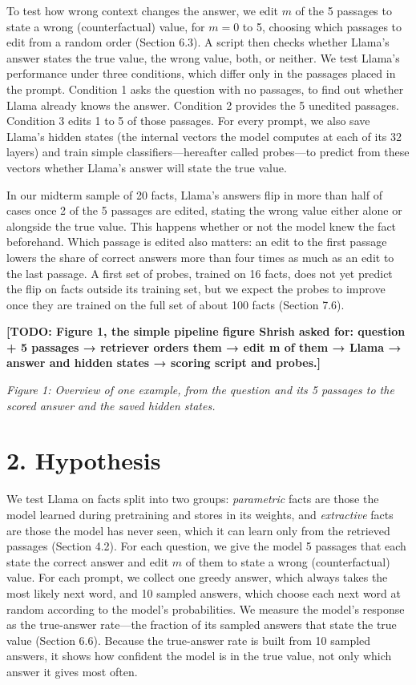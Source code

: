 \documentclass[
  12pt,
  letterpaper,
]{article}
\begin{document}
To test how wrong context changes the answer, we
edit \(m\) of the 5 passages to state a wrong
(counterfactual) value, for \(m = 0\) to 5,
choosing which passages to edit from a random
order (Section 6.3). A script then checks whether
Llama's answer states the true value, the wrong
value, both, or neither. We test Llama's
performance under three conditions, which differ
only in the passages placed in the prompt.
Condition 1 asks the question with no passages, to
find out whether Llama already knows the answer.
Condition 2 provides the 5 unedited passages.
Condition 3 edits 1 to 5 of those passages. For
every prompt, we also save Llama's hidden states
(the internal vectors the model computes at each
of its 32 layers) and train simple
classifiers---hereafter called probes---to predict
from these vectors whether Llama's answer will
state the true value.

In our midterm sample of 20 facts, Llama's answers
flip in more than half of cases once 2 of the 5
passages are edited, stating the wrong value
either alone or alongside the true value. This
happens whether or not the model knew the fact
beforehand. Which passage is edited also matters:
an edit to the first passage lowers the share of
correct answers more than four times as much as an
edit to the last passage. A first set of probes,
trained on 16 facts, does not yet predict the flip
on facts outside its training set, but we expect
the probes to improve once they are trained on the
full set of about 100 facts (Section 7.6).

\textbf{{[}TODO: Figure 1, the simple pipeline
figure Shrish asked for: question + 5 passages →
retriever orders them → edit m of them → Llama →
answer and hidden states → scoring script and
probes.{]}}

\emph{Figure 1: Overview of one example, from the
question and its 5 passages to the scored answer
and the saved hidden states.}

\section{2. Hypothesis}\label{hypothesis}

We test Llama on facts split into two groups:
\emph{parametric} facts are those the model
learned during pretraining and stores in its
weights, and \emph{extractive} facts are those the
model has never seen, which it can learn only from
the retrieved passages (Section 4.2). For each
question, we give the model 5 passages that each
state the correct answer and edit \(m\) of them to
state a wrong (counterfactual) value. For each
prompt, we collect one greedy answer, which always
takes the most likely next word, and 10 sampled
answers, which choose each next word at random
according to the model's probabilities. We measure
the model's response as the true-answer rate---the
fraction of its sampled answers that state the
true value (Section 6.6). Because the true-answer
rate is built from 10 sampled answers, it shows
how confident the model is in the true value, not
only which answer it gives most often.
\end{document}
